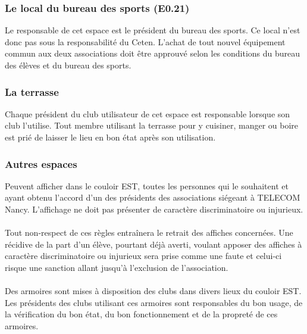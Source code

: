 \documentclass{article} %
\begin{document}
			\subsubsection{Le local du bureau des sports (E0.21)}
\label{ssub:le_local_bureau_des_sports_e0_21_}

				Le responsable de cet espace est le président du bureau des
				sports. Ce local n’est donc pas sous la responsabilité du
				Ceten. L’achat de tout nouvel équipement commun aux deux
				associations doit être approuvé selon les conditions du bureau
				des élèves et du bureau des sports.

			\subsubsection{La terrasse}
\label{ssub:la_terrasse}

				Chaque président du club utilisateur de cet espace est
				responsable lorsque son club l’utilise. Tout membre utilisant
				la terrasse pour y cuisiner, manger ou boire est prié de
				laisser le lieu en bon état après son utilisation.

			\subsubsection{Autres espaces}
\label{ssub:autres_espaces}

				Peuvent afficher dans le couloir EST\@, toutes les personnes qui
				le souhaitent et ayant obtenu l’accord d’un des présidents des
				associations siégeant à TELECOM Nancy. L’affichage ne doit pas
				présenter de caractère discriminatoire ou injurieux.

                \paragraph{}
				Tout non-respect de ces règles entraînera le retrait des
				affiches concernées. Une récidive de la part d’un élève,
				pourtant déjà averti, voulant apposer des affiches à caractère
				discriminatoire ou injurieux sera prise comme une faute et
				celui-ci risque une sanction allant jusqu’à l’exclusion de
				l’association.

                \paragraph{}
				Des armoires sont mises à disposition des clubs dans divers
				lieux du couloir EST\@. Les présidents des clubs utilisant ces
				armoires sont responsables du bon usage, de la vérification du
				bon état, du bon fonctionnement et de la propreté de ces
				armoires. 
\end{document}
